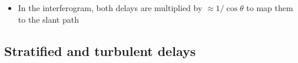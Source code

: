 \documentclass[11pt, oneside]{article}
\newcommand{\wv}{\mathrm{w_{vap}}}
\begin{document}
\begin{itemize}
	\begin{itemize}
		\item[$\Rightarrow$] $\Delta R^\mathrm{zen}_\mathrm{wet} \approx 6.4\,\wv$ (both in mm of length): the wet delay is about six times the depth of the condensed water
		\item Standard atmosphere ($\rho_{\mathrm{vap},0} = 7.72$~g/m$^3$, $H_\mathrm{vap} = 2$~km, so $\wv = \rho_{\mathrm{vap},0}H_\mathrm{vap} \approx 15$~kg/m$^2$): $\Delta R^\mathrm{zen}_\mathrm{wet} \approx 10$~cm. Very humid air with $\wv \approx 50$~kg/m$^2$: $\approx 30$~cm
		\item Smaller than the hydrostatic delay, but highly variable in space and time, because water vapor is (Lecture 10)
	\end{itemize}
	\item In the interferogram, both delays are multiplied by $\approx 1/\cos\theta$ to map them to the slant path
\end{itemize}

\subsection{Stratified and turbulent delays}
\end{document}
